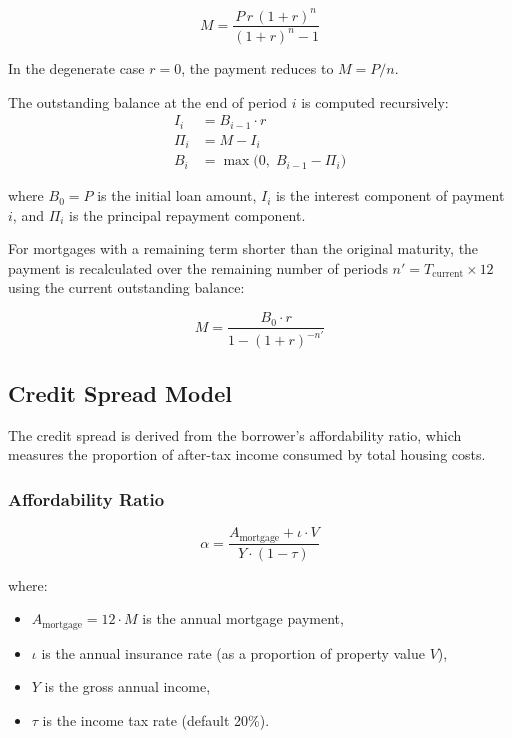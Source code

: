 \documentclass[11pt,a4paper]{article}
\begin{document}
\begin{equation}
\label{eq:monthly_payment}
M = \frac{P \, r \, (1 + r)^{n}}{(1 + r)^{n} - 1}
\end{equation}

In the degenerate case $r = 0$, the payment reduces to $M = P / n$.

The outstanding balance at the end of period $i$ is computed recursively:
\begin{align}
I_i &= B_{i-1} \cdot r \label{eq:interest} \\
\Pi_i &= M - I_i \label{eq:principal} \\
B_i &= \max\!\bigl(0,\; B_{i-1} - \Pi_i\bigr) \label{eq:balance}
\end{align}

\noindent where $B_0 = P$ is the initial loan amount, $I_i$ is the interest component of
payment $i$, and $\Pi_i$ is the principal repayment component.

For mortgages with a remaining term shorter than the original maturity, the payment is
recalculated over the remaining number of periods $n' = T_{\text{current}} \times 12$
using the current outstanding balance:

\begin{equation}
\label{eq:monthly_payment_remaining}
M = \frac{B_0 \cdot r}{1 - (1 + r)^{-n'}}
\end{equation}

\subsection{Credit Spread Model}
\label{sec:credit_spread}

The credit spread is derived from the borrower's affordability ratio, which measures the
proportion of after-tax income consumed by total housing costs.

\subsubsection{Affordability Ratio}

\begin{equation}
\label{eq:affordability}
\alpha = \frac{A_{\text{mortgage}} + \iota \cdot V}{Y \cdot (1 - \tau)}
\end{equation}

\noindent where:
\begin{itemize}[nosep]
    \item $A_{\text{mortgage}} = 12 \cdot M$ is the annual mortgage payment,
    \item $\iota$ is the annual insurance rate (as a proportion of property value $V$),
    \item $Y$ is the gross annual income,
    \item $\tau$ is the income tax rate (default 20\%).
\end{itemize}
\end{document}
